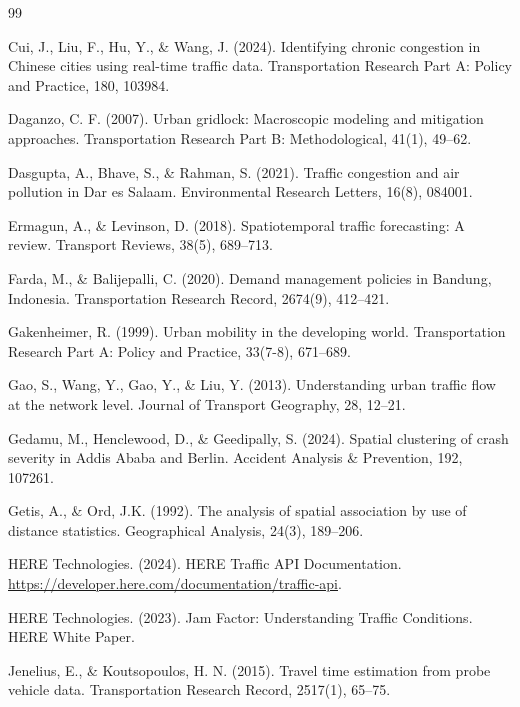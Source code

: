 \documentclass[12pt,a4paper]{article}
\begin{document}
\begin{thebibliography}{99}
\item Cui, J., Liu, F., Hu, Y., \& Wang, J. (2024). Identifying chronic congestion in Chinese cities using real-time traffic data. Transportation Research Part A: Policy and Practice, 180, 103984.

\item Daganzo, C. F. (2007). Urban gridlock: Macroscopic modeling and mitigation approaches. Transportation Research Part B: Methodological, 41(1), 49--62.

\item Dasgupta, A., Bhave, S., \& Rahman, S. (2021). Traffic congestion and air pollution in Dar es Salaam. Environmental Research Letters, 16(8), 084001.

\item Ermagun, A., \& Levinson, D. (2018). Spatiotemporal traffic forecasting: A review. Transport Reviews, 38(5), 689--713.

\item Farda, M., \& Balijepalli, C. (2020). Demand management policies in Bandung, Indonesia. Transportation Research Record, 2674(9), 412--421.

\item Gakenheimer, R. (1999). Urban mobility in the developing world. Transportation Research Part A: Policy and Practice, 33(7-8), 671--689.

\item Gao, S., Wang, Y., Gao, Y., \& Liu, Y. (2013). Understanding urban traffic flow at the network level. Journal of Transport Geography, 28, 12--21.

\item Gedamu, M., Henclewood, D., \& Geedipally, S. (2024). Spatial clustering of crash severity in Addis Ababa and Berlin. Accident Analysis \& Prevention, 192, 107261.

\item Getis, A., \& Ord, J.K. (1992). The analysis of spatial association by use of distance statistics. Geographical Analysis, 24(3), 189--206.

\item HERE Technologies. (2024). HERE Traffic API Documentation. \url{https://developer.here.com/documentation/traffic-api}.

\item HERE Technologies. (2023). Jam Factor: Understanding Traffic Conditions. HERE White Paper.

\item Jenelius, E., \& Koutsopoulos, H. N. (2015). Travel time estimation from probe vehicle data. Transportation Research Record, 2517(1), 65--75.


\end{thebibliography}
\end{document}
